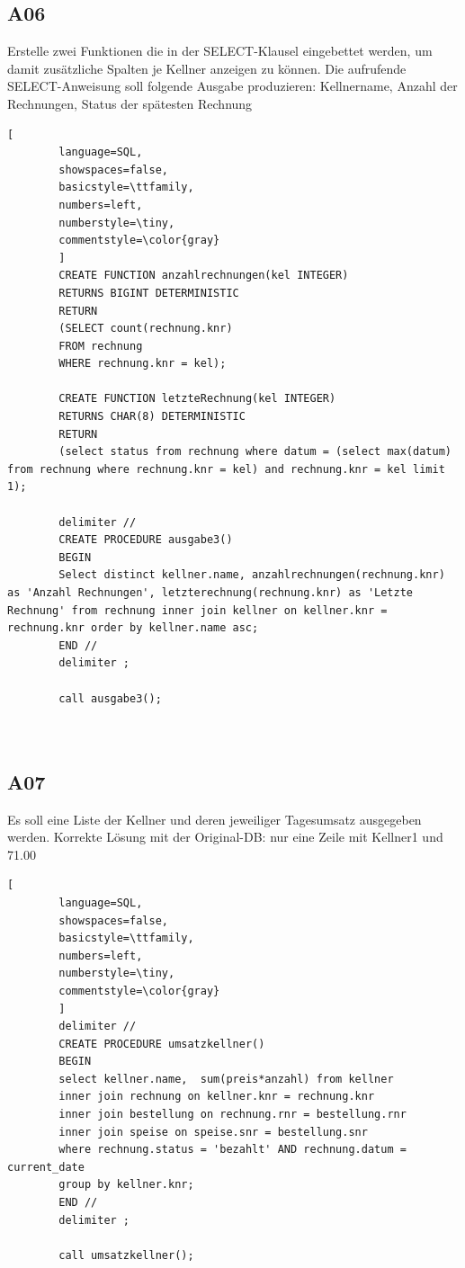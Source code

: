 		\clearpage
	\subsection{A06}
		Erstelle zwei Funktionen die in der SELECT-Klausel eingebettet werden, um damit zusätzliche Spalten je Kellner anzeigen zu können. Die aufrufende SELECT-Anweisung soll folgende Ausgabe produzieren:
		Kellnername, Anzahl der Rechnungen, Status der spätesten Rechnung
		
		\begin{lstlisting}[
		language=SQL,
		showspaces=false,
		basicstyle=\ttfamily,
		numbers=left,
		numberstyle=\tiny,
		commentstyle=\color{gray}
		]
		CREATE FUNCTION anzahlrechnungen(kel INTEGER)
		RETURNS BIGINT DETERMINISTIC
		RETURN
		(SELECT count(rechnung.knr) 
		FROM rechnung
		WHERE rechnung.knr = kel);
		
		CREATE FUNCTION letzteRechnung(kel INTEGER)
		RETURNS CHAR(8) DETERMINISTIC
		RETURN
		(select status from rechnung where datum = (select max(datum) from rechnung where rechnung.knr = kel) and rechnung.knr = kel limit 1);
		
		delimiter //
		CREATE PROCEDURE ausgabe3()
		BEGIN
		Select distinct kellner.name, anzahlrechnungen(rechnung.knr) as 'Anzahl Rechnungen', letzterechnung(rechnung.knr) as 'Letzte Rechnung' from rechnung inner join kellner on kellner.knr = rechnung.knr order by kellner.name asc;
		END //
		delimiter ;
		
		call ausgabe3();
		
			
		\end{lstlisting}
		\clearpage
	\subsection{A07}
		Es soll eine Liste der Kellner und deren jeweiliger Tagesumsatz ausgegeben werden.
		Korrekte Lösung mit der Original-DB: nur eine Zeile mit Kellner1 und 71.00
		
		\begin{lstlisting}[
		language=SQL,
		showspaces=false,
		basicstyle=\ttfamily,
		numbers=left,
		numberstyle=\tiny,
		commentstyle=\color{gray}
		]
		delimiter //
		CREATE PROCEDURE umsatzkellner()
		BEGIN
		select kellner.name,  sum(preis*anzahl) from kellner
		inner join rechnung on kellner.knr = rechnung.knr 
		inner join bestellung on rechnung.rnr = bestellung.rnr
		inner join speise on speise.snr = bestellung.snr 
		where rechnung.status = 'bezahlt' AND rechnung.datum = current_date
		group by kellner.knr;
		END //
		delimiter ;
		
		call umsatzkellner();
			
			
		\end{lstlisting}
		
